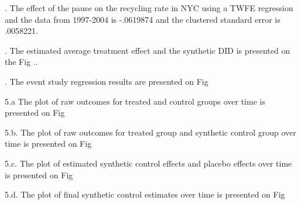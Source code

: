 \documentclass{article}
\begin{document}
\clearpage

. The effect of the pause on the recycling rate in NYC using a TWFE regression and the data
from 1997-2004 is  -.0619874 and the clustered standard error is  .0058221.


. The estimated average treatment effect and the synthetic DID is presented on the Fig ..

.  The event study regression results are presented on Fig 


\noindent 5.a The plot of raw outcomes for treated and control groups over time is presented on Fig 

\noindent 5.b. The plot of raw outcomes for treated group and synthetic control group over time is presented on Fig 

\noindent 5.c. The plot of estimated synthetic control effects and placebo effects over time is presented on Fig 

\noindent 5.d. The plot of final synthetic control estimates over time is presented on Fig 
\end{document}
